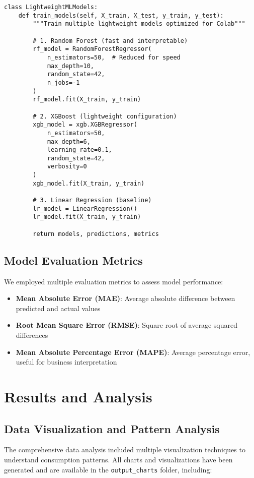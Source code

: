 \documentclass[12pt,a4paper]{article}
\begin{document}
\begin{lstlisting}[caption={Lightweight ML Models Implementation}]
class LightweightMLModels:
    def train_models(self, X_train, X_test, y_train, y_test):
        """Train multiple lightweight models optimized for Colab"""
        
        # 1. Random Forest (fast and interpretable)
        rf_model = RandomForestRegressor(
            n_estimators=50,  # Reduced for speed
            max_depth=10,
            random_state=42,
            n_jobs=-1
        )
        rf_model.fit(X_train, y_train)
        
        # 2. XGBoost (lightweight configuration)
        xgb_model = xgb.XGBRegressor(
            n_estimators=50,
            max_depth=6,
            learning_rate=0.1,
            random_state=42,
            verbosity=0
        )
        xgb_model.fit(X_train, y_train)
        
        # 3. Linear Regression (baseline)
        lr_model = LinearRegression()
        lr_model.fit(X_train, y_train)
        
        return models, predictions, metrics
\end{lstlisting}

\subsection{Model Evaluation Metrics}
We employed multiple evaluation metrics to assess model performance:

\begin{itemize}
    \item \textbf{Mean Absolute Error (MAE)}: Average absolute difference between predicted and actual values
    \item \textbf{Root Mean Square Error (RMSE)}: Square root of average squared differences
    \item \textbf{Mean Absolute Percentage Error (MAPE)}: Average percentage error, useful for business interpretation
\end{itemize}

\section{Results and Analysis}

\subsection{Data Visualization and Pattern Analysis}
The comprehensive data analysis included multiple visualization techniques to understand consumption patterns. All charts and visualizations have been generated and are available in the \texttt{output\_charts} folder, including:
\end{document}
